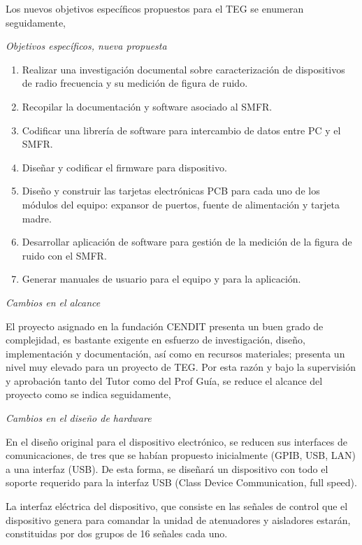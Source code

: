\documentclass[paper=letter,oneside,fontsize=12pt, parskip=full]{article}
\begin{document}
	Los nuevos objetivos específicos propuestos para el TEG se enumeran seguidamente,
	
	\emph{Objetivos específicos, nueva propuesta}
		
	\begin{enumerate}
		\item Realizar una investigación documental sobre caracterización de dispositivos de radio frecuencia y su medición de figura de ruido.
		
		\item Recopilar la documentación y software asociado al SMFR.
		
		\item Codificar una librería de software para intercambio de datos entre PC y el SMFR.
		
		\item Diseñar y codificar el firmware para dispositivo.
		
		\item Diseño y construir las tarjetas electrónicas PCB para cada uno de los módulos del equipo: expansor de puertos, fuente de alimentación y tarjeta madre.
		
		\item Desarrollar aplicación de software para gestión de la medición de la figura de ruido con el SMFR.
		
		\item Generar manuales de usuario para el equipo y para la aplicación.
	\end{enumerate}		

	\emph{Cambios en el alcance}
	
	El proyecto asignado en la fundación CENDIT presenta un buen grado de complejidad, es bastante exigente en esfuerzo de investigación, diseño, implementación y documentación, así como en recursos materiales; presenta un nivel muy elevado para un proyecto de TEG. Por esta razón y bajo la supervisión y aprobación tanto del Tutor como del Prof Guía, se reduce el alcance del proyecto como se indica seguidamente,
	
	\emph{Cambios en el diseño de hardware}

	En el diseño original para el dispositivo electrónico, se reducen sus  interfaces de comunicaciones, de tres que se habían propuesto inicialmente (GPIB, USB, LAN) a una interfaz (USB). De esta forma, se diseñará un dispositivo con todo el soporte requerido para la interfaz USB (Class Device Communication, full speed).			

	La interfaz eléctrica del dispositivo, que consiste en las señales de control que el dispositivo genera para comandar la unidad de atenuadores y aisladores estarán, constituidas por dos grupos de 16 señales cada uno. 
	
\end{document}
